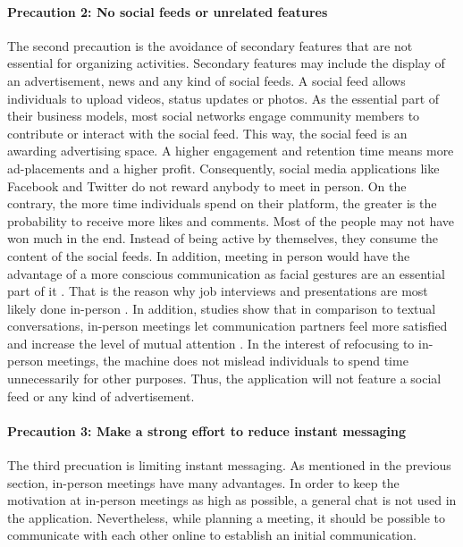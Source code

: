 \documentclass[12pt,numbers=noenddot,parskip,bibliography=totocnumbered,listof=totocnumbered,draft]{scrreprt}
\begin{document}
\paragraph{Precaution 2: No social feeds or unrelated features}
The second precaution is the avoidance of secondary features that are not essential for organizing activities. Secondary features may include the display of an advertisement, news and any kind of social feeds. A social feed allows individuals to upload videos, status updates or photos. As the essential part of their business models, most social networks engage community members to contribute or interact with the social feed. This way, the social feed is an awarding advertising space. A higher engagement and retention time means more ad-placements and a higher profit. Consequently, social media applications like Facebook and Twitter do not reward anybody to meet in person. On the contrary, the more time individuals spend on their platform, the greater is the probability to receive more likes and comments. Most of the people may not have won much in the end. Instead of being active by themselves, they consume the content of the social feeds. In addition, meeting in person would have the advantage of a more conscious communication as facial gestures are an essential part of it  \citep{vanderkam2017}. That is the reason why job interviews and presentations are most likely done in-person \citep{vanderkam2017}. In addition, studies show that in comparison to textual conversations, in-person meetings let communication partners feel more satisfied and increase the level of mutual attention \citep{vanderkam2017}. \newline
In the interest of refocusing to in-person meetings, the machine does not mislead individuals to spend time unnecessarily for other purposes. Thus, the application will not feature a social feed or any kind of advertisement.

\paragraph{Precaution 3: Make a strong effort to reduce instant messaging}
The third precuation is limiting instant messaging. As mentioned in the previous section, in-person meetings have many advantages. In order to keep the motivation at in-person meetings as high as possible, a general chat is not used in the application. Nevertheless, while planning a meeting, it should be possible to communicate with each other online to establish an initial communication.
\end{document}
